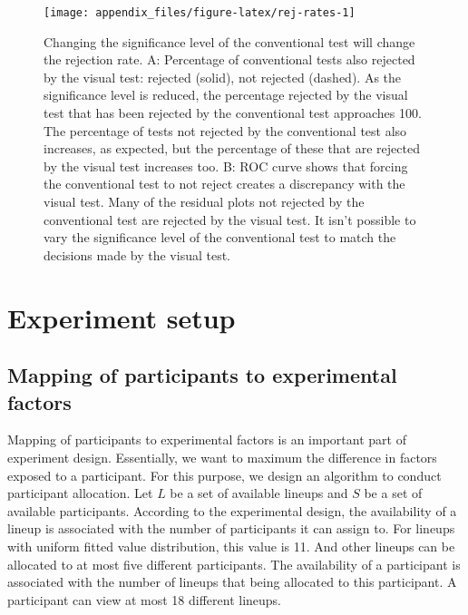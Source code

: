 \documentclass[]{interact}
\theoremstyle{plain}%
\theoremstyle{definition}
\theoremstyle{remark}
\begin{document}
\begin{figure}[t!]

{\centering \texttt{[image: appendix\_files/figure-latex/rej-rates-1]} 

}

\caption{Changing the significance level of the conventional test will change the rejection rate. A: Percentage of conventional tests also rejected by the visual test: rejected (solid), not rejected (dashed). As the significance level is reduced, the percentage rejected by the visual test that has been rejected by the conventional test approaches 100. The percentage of tests not rejected by the conventional test also increases, as expected, but the percentage of these that are rejected by the visual test increases too. B: ROC curve shows that forcing the conventional test to not reject creates a discrepancy with the visual test. Many of the residual plots not rejected by the conventional test are rejected by the visual test. It isn't possible to vary the significance level of the conventional test to match the decisions made by the visual test.}\label{fig:rej-rates}
\end{figure}

\hypertarget{experiment-setup}{%
\section{Experiment setup}\label{experiment-setup}}

\hypertarget{mapping-of-participants-to-experimental-factors}{%
\subsection{Mapping of participants to experimental
factors}\label{mapping-of-participants-to-experimental-factors}}

Mapping of participants to experimental factors is an important part of
experiment design. Essentially, we want to maximum the difference in
factors exposed to a participant. For this purpose, we design an
algorithm to conduct participant allocation. Let \(L\) be a set of
available lineups and \(S\) be a set of available participants.
According to the experimental design, the availability of a lineup is
associated with the number of participants it can assign to. For lineups
with uniform fitted value distribution, this value is 11. And other
lineups can be allocated to at most five different participants. The
availability of a participant is associated with the number of lineups
that being allocated to this participant. A participant can view at most
18 different lineups.
\end{document}
